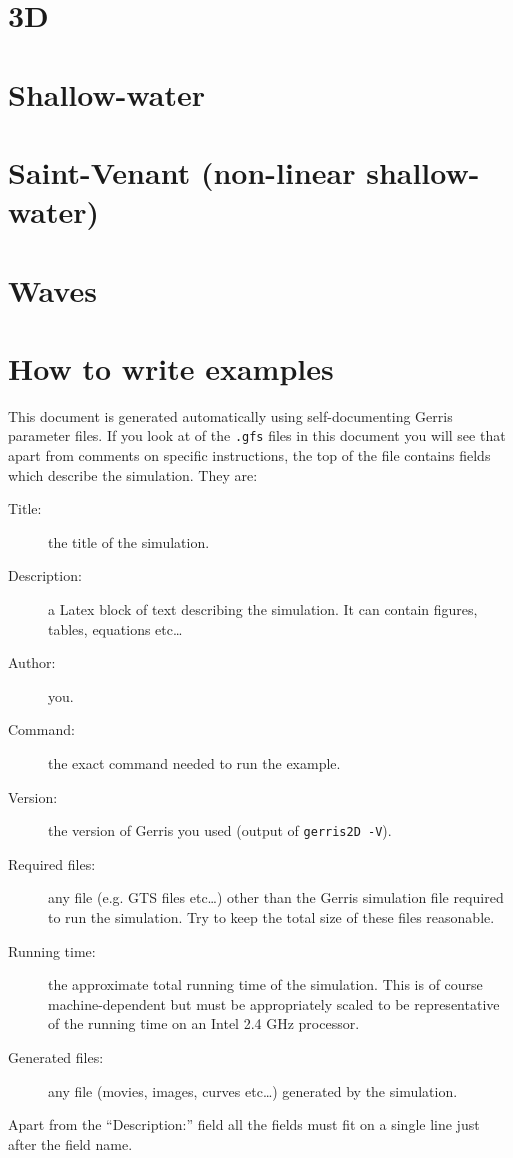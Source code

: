 \documentclass[a4paper]{article}
\newcommand{\htmladdnormallinkfoot}[2]{\footahref{#2}{#1}}
\begin{document}






\section{3D}




\section{Shallow-water}



\section{Saint-Venant (non-linear shallow-water)}




\section{Waves}



\section{\label{howto}How to write examples}

This document is generated automatically using self-documenting Gerris parameter files. If you look at \htmladdnormallinkfoot{any}{cylinder/cylinder.gfs} of the {\tt .gfs} files in this document you will see that apart from comments on specific instructions, the top of the file contains fields which describe the simulation. They are:
\begin{description}
\item[Title:] the title of the simulation.
\item[Description:] a Latex block of text describing the simulation. It can contain figures, tables, equations etc\dots
\item[Author:] you.
\item[Command:] the exact command needed to run the example.
\item[Version:] the version of Gerris you used (output of {\tt gerris2D -V}).
\item[Required files:] any file (e.g. GTS files etc\dots) other than the Gerris simulation file required to run the simulation. Try to keep the total size of these files reasonable.
\item[Running time:] the approximate total running time of the simulation. This is of course machine-dependent but must be appropriately scaled to be representative of the running time on an Intel 2.4 GHz processor.
\item[Generated files:] any file (movies, images, curves etc\dots) generated by the simulation.
\end{description}
Apart from the ``Description:'' field all the fields must fit on a single line just after the field name.
\end{document}

